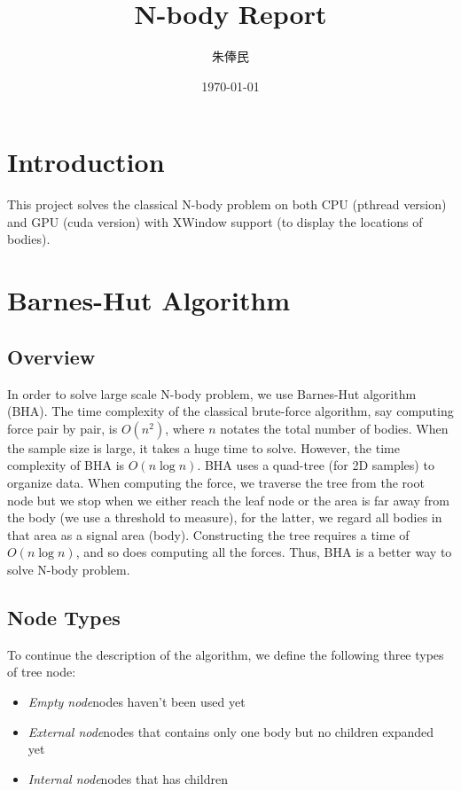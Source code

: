 \documentclass[11pt, a4paper]{article}
\title{\textbf{N-body Report}}
\author{\kai 朱俸民}
\date{\today}
\begin{document}
\maketitle

\section{Introduction}

This project solves the classical N-body problem on both CPU (pthread version) and GPU (cuda version) with XWindow support (to display the locations of bodies).

\section{Barnes-Hut Algorithm}

\subsection{Overview}

In order to solve large scale N-body problem, we use Barnes-Hut algorithm (BHA). The time complexity of the classical brute-force algorithm, say computing force pair by pair, is $O(n^2)$, where $n$ notates the total number of bodies. When the sample size is large, it takes a huge time to solve. However, the time complexity of BHA is $O(n \log n)$. BHA uses a quad-tree (for 2D samples) to organize data. When computing the force, we traverse the tree from the root node but we stop when we either reach the leaf node or the area is far away from the body (we use a threshold to measure), for the latter, we regard all bodies in that area as a signal area (body). Constructing the tree requires a time of $O(n \log n)$, and so does computing all the forces. Thus, BHA is a better way to solve N-body problem.

\subsection{Node Types}

To continue the description of the algorithm, we define the following three types of tree node:

\begin{itemize}
    \item \textit{Empty node}\quad nodes haven't been used yet
    \item \textit{External node}\quad nodes that contains only one body but no children expanded yet
    \item \textit{Internal node}\quad nodes that has children
\end{itemize}
\end{document}
